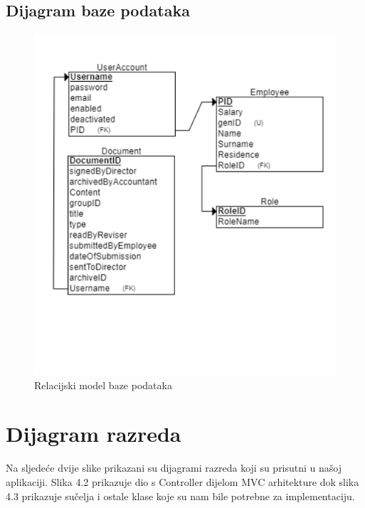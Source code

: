 			\subsection{Dijagram baze podataka}
			
			\begin{figure}[H]
				\includegraphics[scale=0.58]{slike/RELschema.png} %
				\centering
				\caption{Relacijski model baze podataka}
				\label{REL}
			\end{figure}
			
			
			
			
			
			\newpage
			\section{Dijagram razreda}
			Na sljedeće dvije slike prikazani su dijagrami razreda koji su prisutni u našoj aplikaciji. Slika 4.2 prikazuje dio s Controller dijelom MVC arhitekture dok slika 4.3 prikazuje sučelja i ostale klase koje su nam bile potrebne za implementaciju. 
			
